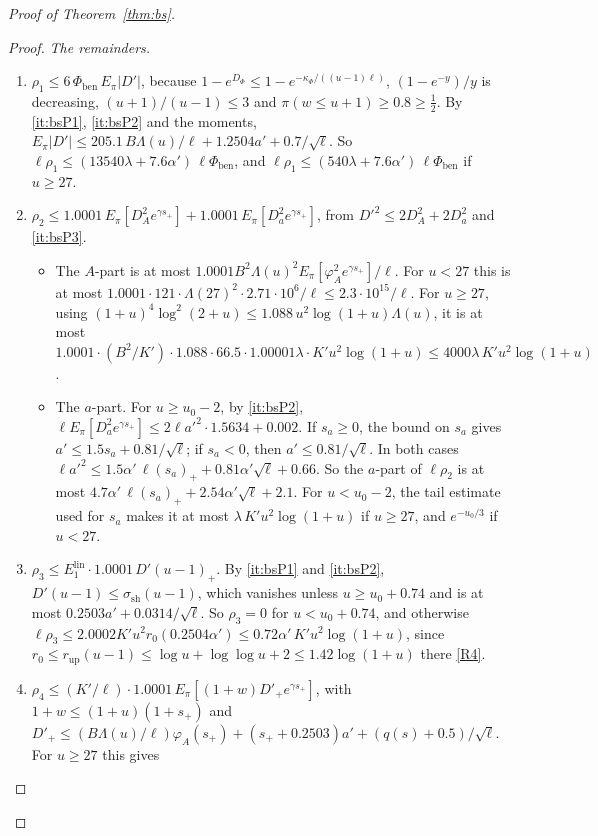 \begin{proof}[Proof of Theorem~\ref{thm:bs}]
\begin{proof}
\emph{The remainders.}
\begin{enumerate}[label=(\alph*)]
\item $\rho_1\le6\,\Phi_{\mathrm{ben}}\,E_\pi|D'|$, because $1-e^{D_\Phi}\le1-e^{-\kappa_\Phi/((u-1)\ell)}$, $(1-e^{-y})/y$ is
  decreasing, $(u+1)/(u-1)\le3$ and $\pi(w\le u+1)\ge0.8\ge\frac12$. By \ref{it:bsP1}, \ref{it:bsP2} and the moments,
  $E_\pi|D'|\le205.1\,B\Lambda(u)/\ell+1.2504a'+0.7/\sqrt\ell$. So
  $\ell\rho_1\le(13540\lambda+7.6\alpha')\,\ell\Phi_{\mathrm{ben}}$, and $\ell\rho_1\le(540\lambda+7.6\alpha')\,\ell\Phi_{\mathrm{ben}}$ if $u\ge27$.
\item $\rho_2\le1.0001\,E_\pi[D_A^2e^{\gamma s_+}]+1.0001\,E_\pi[D_a^2e^{\gamma s_+}]$, from $D'^2\le2D_A^2+2D_a^2$ and \ref{it:bsP3}.
  \begin{itemize}
  \item The $A$-part is at most $1.0001B^2\Lambda(u)^2E_\pi[\varphi_A^2e^{\gamma s_+}]/\ell$. For $u<27$ this is at most
    $1.0001\cdot121\cdot\Lambda(27)^2\cdot2.71\cdot10^6/\ell\le2.3\cdot10^{15}/\ell$. For $u\ge27$, using
    $(1+u)^4\log^2(2+u)\le1.088\,u^2\log(1+u)\Lambda(u)$, it is at most
    $1.0001\cdot(B^2/K')\cdot1.088\cdot66.5\cdot1.00001\lambda\cdot K'u^2\log(1+u)\le4000\lambda\,K'u^2\log(1+u)$.
  \item The $a$-part. For $u\ge u_0-2$, by \ref{it:bsP2}, $\ell E_\pi[D_a^2e^{\gamma s_+}]\le2\ell a'^2\cdot1.5634+0.002$. If
    $s_a\ge0$, the bound on $s_a$ gives $a'\le1.5s_a+0.81/\sqrt\ell$; if $s_a<0$, then $a'\le0.81/\sqrt\ell$. In both cases
    $\ell a'^2\le1.5\alpha'\,\ell(s_a)_++0.81\alpha'\sqrt\ell+0.66$. So the $a$-part of $\ell\rho_2$ is at most
    $4.7\alpha'\,\ell(s_a)_++2.54\alpha'\sqrt\ell+2.1$. For $u<u_0-2$, the tail estimate used for $s_a$ makes it at most
    $\lambda\,K'u^2\log(1+u)$ if $u\ge27$, and $e^{-u_0/3}$ if $u<27$.
  \end{itemize}
\item $\rho_3\le E_1^{\mathrm{lin}}\cdot1.0001\,D'(u-1)_+$. By \ref{it:bsP1} and \ref{it:bsP2}, $D'(u-1)\le\sigma_{\mathrm{sh}}(u-1)$, which
  vanishes unless $u\ge u_0+0.74$ and is at most $0.2503a'+0.0314/\sqrt\ell$. So $\rho_3=0$ for $u<u_0+0.74$, and otherwise
  $\ell\rho_3\le2.0002K'u^2r_0(0.2504\alpha')\le0.72\alpha'\,K'u^2\log(1+u)$, since
  $r_0\le r_{\mathrm{up}}(u-1)\le\log u+\log\log u+2\le1.42\log(1+u)$ there \ref{R4}.
\item $\rho_4\le(K'/\ell)\cdot1.0001\,E_\pi[(1+w)D'_+e^{\gamma s_+}]$, with $1+w\le(1+u)(1+s_+)$ and
  $D'_+\le(B\Lambda(u)/\ell)\varphi_A(s_+)+(s_++0.2503)a'+(q(s)+0.5)/\sqrt\ell$. For $u\ge27$ this gives

\end{enumerate}
\end{proof}
\end{proof}
